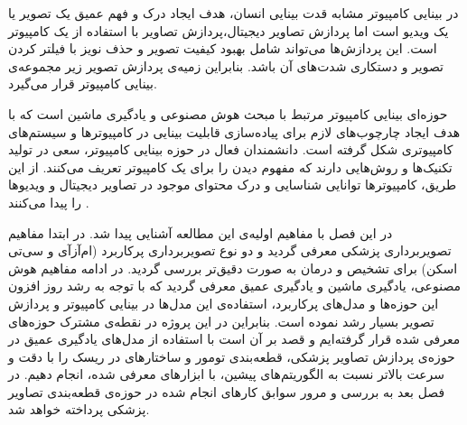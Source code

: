 در بینایی کامپیوتر مشابه قدت بینایی انسان، هدف ایجاد درک و فهم عمیق یک تصویر یا یک ویدیو است اما پردازش تصاویر دیجیتال،پردازش تصاویر با استفاده از یک کامپیوتر است. این پردازش‌ها می‌تواند شامل بهبود کیفیت تصویر و حذف نویز با فیلتر کردن تصویر و دستکاری شدت‌های آن باشد. بنابراین زمیه‌ی پردازش‌ تصویر زیر مجموعه‌ی بینایی کامپیوتر قرار می‌گیرد. 

حوزه‌ای بینایی کامپیوتر مرتبط با مبحث هوش مصنوعی و یادگیری ماشین است که با هدف ایجاد چارچوب‌های لازم برای پیاده‌سازی قابلیت بینایی در کامپیوترها و سیستم‌های کامپیوتری شکل گرفته‌ است. دانشمندان فعال در حوزه بینایی کامپیوتر، سعی در تولید تکنیک‌ها و روش‌هایی دارند که مفهوم دیدن را برای یک کامپیوتر تعریف می‌کنند. از این طریق، کامپیوترها توانایی شناسایی و درک محتوای موجود در تصاویر دیجیتال و ویدیو‌ها را پیدا می‌کنند .

در این فصل با مفاهیم اولیه‌ی این مطالعه آشنایی پیدا شد. در ابتدا مفاهیم تصویربرداری پزشکی معرفی گردید و دو نوع تصویربرداری پرکاربرد (ام‌آزآی و سی‌تی اسکن) برای تشخیص و درمان به صورت دقیق‌تر بررسی گردید. در ادامه مفاهیم هوش مصنوعی، یادگیری ماشین و یادگیری عمیق معرفی گردید که با توجه به رشد روز افزون این حوزه‌ها و مدل‌های پرکاربرد، استفاده‌ی این مدل‌ها در بینایی کامپیوتر و پردازش تصویر بسیار رشد نموده است. بنابراین در این پروژه در نقطه‌ی مشترک حوزه‌های معرفی شده قرار گرفته‌ایم و قصد بر آن است با استفاده از مدل‌های یادگیری عمیق در حوزه‌ی پردازش تصاویر پزشکی، قطعه‌بندی تومور و ساختارهای در ریسک را با دقت و سرعت بالاتر نسبت به الگوریتم‌های پیشین، با ابزارهای معرفی شده، انجام دهیم. در فصل بعد به بررسی و مرور سوابق کارهای انجام شده در حوزه‌ی قطعه‌بندی تصاویر پزشکی پرداخته خواهد شد.